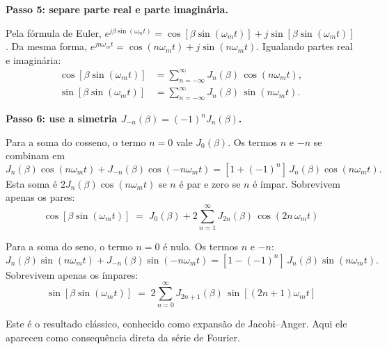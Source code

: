 \documentclass[11pt,a4paper]{article}
\begin{document}
\begin{quadro}
\textbf{Passo 5: separe parte real e parte imaginária.}

Pela fórmula de Euler, $e^{j\beta\sin(\omega_m t)} = \cos[\beta\sin(\omega_m t)] + j\sin[\beta\sin(\omega_m t)]$. Da mesma forma, $e^{jn\omega_m t} = \cos(n\omega_m t) + j\sin(n\omega_m t)$. Igualando partes real e imaginária:
\begin{align*}
  \cos[\beta\sin(\omega_m t)] &= \sum_{n=-\infty}^{\infty} J_n(\beta)\,\cos(n\omega_m t),\\
  \sin[\beta\sin(\omega_m t)] &= \sum_{n=-\infty}^{\infty} J_n(\beta)\,\sin(n\omega_m t).
\end{align*}

\textbf{Passo 6: use a simetria $J_{-n}(\beta) = (-1)^n J_n(\beta)$.}

Para a soma do cosseno, o termo $n=0$ vale $J_0(\beta)$. Os termos $n$ e $-n$ se combinam em
\[
  J_n(\beta)\cos(n\omega_m t) + J_{-n}(\beta)\cos(-n\omega_m t)
  = [1 + (-1)^n]\,J_n(\beta)\cos(n\omega_m t).
\]
Esta soma é $2J_n(\beta)\cos(n\omega_m t)$ se $n$ é par e zero se $n$ é ímpar. Sobrevivem apenas os pares:
\[
  \boxed{\;\cos[\beta\sin(\omega_m t)] \;=\; J_0(\beta) + 2\!\sum_{n=1}^{\infty}\! J_{2n}(\beta)\,\cos(2n\,\omega_m t)\;}
\]

Para a soma do seno, o termo $n=0$ é nulo. Os termos $n$ e $-n$:
\[
  J_n(\beta)\sin(n\omega_m t) + J_{-n}(\beta)\sin(-n\omega_m t)
  = [1 - (-1)^n]\,J_n(\beta)\sin(n\omega_m t).
\]
Sobrevivem apenas os ímpares:
\[
  \boxed{\;\sin[\beta\sin(\omega_m t)] \;=\; 2\!\sum_{n=0}^{\infty}\! J_{2n+1}(\beta)\,\sin[(2n+1)\omega_m t]\;}
\]

Este é o resultado clássico, conhecido como expansão de Jacobi--Anger. Aqui ele apareceu como consequência direta da série de Fourier.
\end{quadro}
\end{document}
